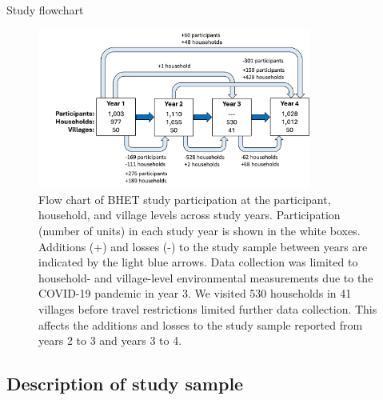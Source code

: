 \documentclass[
  letterpaper,
  DIV=11,
  numbers=noendperiod]{scrartcl}
\begin{document}
Study flowchart

\begin{figure}[H]

{\centering \includegraphics[width=0.8\textwidth,height=\textheight]{images/participation-flow-chart-Mar18.png}

}

\caption{\label{fig-flowchart}Flow chart of BHET study participation at
the participant, household, and village levels across study years.
Participation (number of units) in each study year is shown in the white
boxes. Additions (+) and losses (-) to the study sample between years
are indicated by the light blue arrows. Data collection was limited to
household- and village-level environmental measurements due to the
COVID-19 pandemic in year 3. We visited 530 households in 41 villages
before travel restrictions limited further data collection. This affects
the additions and losses to the study sample reported from years 2 to 3
and years 3 to 4.}

\end{figure}

\hypertarget{description-of-study-sample}{%
\subsection{Description of study
sample}\label{description-of-study-sample}}
\end{document}
